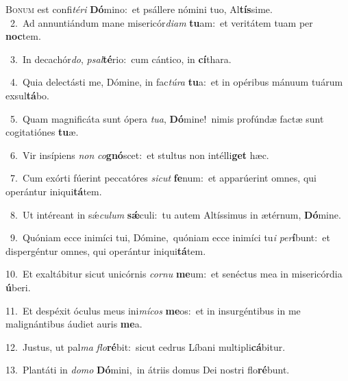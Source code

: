\lettrine{\initial\textcolor{\initialcolor}{B}}{onum} est confi\-\textit{té}\-\textit{ri} \textbf{Dó}\-mino:~\star et psállere nómini tuo, Al\-\textbf{tís}\-sime.\\
{\numbfont\textcolor{\numbcolor}{~2.}}~Ad annuntiándum mane misericór\-\textit{di}\-\textit{am} \textbf{tu}\-am:~\star et veritátem tuam per \textbf{noc}\-tem.\par
{\numbfont\textcolor{\numbcolor}{~3.}}~In decachór\-\textit{do}\-, \textit{psal}\-\textbf{té}rio:~\star cum cántico, in \textbf{cí}\-thara.\par
{\numbfont\textcolor{\numbcolor}{~4.}}~Quia delectásti me, Dómine, in fac\-\textit{tú}\-\textit{ra} \textbf{tu}\-a:~\star et in opéribus mánuum tuárum exsul\-\textbf{tá}\-bo.\par
{\numbfont\textcolor{\numbcolor}{~5.}}~Quam magnificáta sunt ópera \textit{tu}\-\textit{a}, \textbf{Dó}\-mine!~\star nimis profúndæ factæ sunt cogitatiónes \textbf{tu}\-æ.\par
{\numbfont\textcolor{\numbcolor}{~6.}}~Vir insípiens \textit{non} \textit{co}\-\textbf{gnó}scet:~\star et stultus non intélli\textbf{get} hæc.\par
{\numbfont\textcolor{\numbcolor}{~7.}}~Cum exórti fúerint peccatóres \textit{sic}\-\textit{ut} \textbf{fe}\-num:~\star et apparúerint omnes, qui operántur iniqui\-\textbf{tá}\-tem.\par
{\numbfont\textcolor{\numbcolor}{~8.}}~Ut intéreant in sǽ\-\textit{cu}\-\textit{lum} \textbf{sǽ}\-culi:~\star tu autem Altíssimus in ætérnum, \textbf{Dó}\-mine.\par
{\numbfont\textcolor{\numbcolor}{~9.}}~Quóniam ecce inimíci tui, Dómine,~\dagger quóniam ecce inimíci tu\textit{i} \textit{per}\-\textbf{í}bunt:~\star et dispergéntur omnes, qui operántur iniqui\-\textbf{tá}\-tem.\par
{\numbfont\textcolor{\numbcolor}{10.}}~Et exaltábitur sicut unicórnis \textit{cor}\-\textit{nu} \textbf{me}\-um:~\star et senéctus mea in misericórdia \textbf{ú}\-beri.\par
{\numbfont\textcolor{\numbcolor}{11.}}~Et despéxit óculus meus ini\-\textit{mí}\-\textit{cos} \textbf{me}\-os:~\star et in insurgéntibus in me malignántibus áudiet auris \textbf{me}\-a.\par
{\numbfont\textcolor{\numbcolor}{12.}}~Justus, ut pal\textit{ma} \textit{flo}\-\textbf{ré}bit:~\star sicut cedrus Líbani multipli\-\textbf{cá}\-bitur.\par
{\numbfont\textcolor{\numbcolor}{13.}}~Plantáti in \textit{do}\-\textit{mo} \textbf{Dó}\-mini,~\star in átriis domus Dei nostri flo\-\textbf{ré}\-bunt.\par
